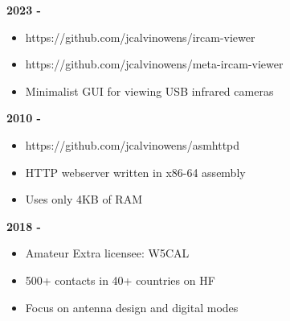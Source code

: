 \documentclass[11pt]{article}
\begin{document}
\begin{multicols}{2}
 \hfill {\bf 2023 -}
\begin{itemize}[leftmargin=2em]
\itemsep 0em
	\item https://github.com/jcalvinowens/ircam-viewer
	\item https://github.com/jcalvinowens/meta-ircam-viewer
	\item Minimalist GUI for viewing USB infrared cameras
\end{itemize}

 \hfill {\bf 2010 -}
\begin{itemize}[leftmargin=2em]
\itemsep 0em
	\item https://github.com/jcalvinowens/asmhttpd
	\item HTTP webserver written in x86-64 assembly
	\item Uses only 4KB of RAM
\end{itemize}

 \hfill {\bf 2018 -}
\begin{itemize}[leftmargin=2em]
\itemsep 0em
	\item Amateur Extra licensee: W5CAL
	\item 500+ contacts in 40+ countries on HF
	\item Focus on antenna design and digital modes
\end{itemize}

\end{multicols}
\end{document}
